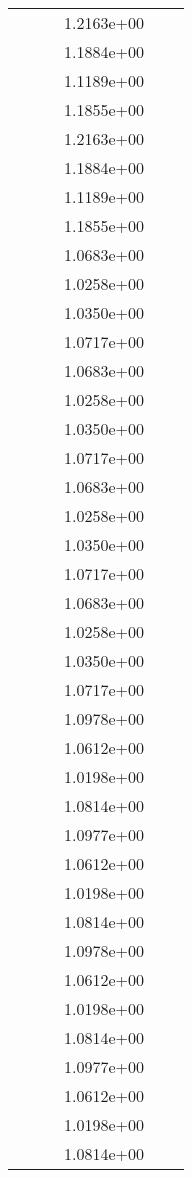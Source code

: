 \begin{xltabular}{\textwidth}{r|rS[table-format=1.3e+2]S[table-format=1.4e+2]S[table-format=1.4e+2]S[table-format=-1.5]}
&  &  & 1.2163e+00 & & \\
&  &  & 1.1884e+00 & & \\
&  &  & 1.1189e+00 & & \\
&  &  & 1.1855e+00 & & \\
&  &  & 1.2163e+00 & & \\
&  &  & 1.1884e+00 & & \\
&  &  & 1.1189e+00 & & \\
&  &  & 1.1855e+00 & & \\
&  &  & 1.0683e+00 & & \\
&  &  & 1.0258e+00 & & \\
&  &  & 1.0350e+00 & & \\
&  &  & 1.0717e+00 & & \\
&  &  & 1.0683e+00 & & \\
&  &  & 1.0258e+00 & & \\
&  &  & 1.0350e+00 & & \\
&  &  & 1.0717e+00 & & \\
&  &  & 1.0683e+00 & & \\
&  &  & 1.0258e+00 & & \\
&  &  & 1.0350e+00 & & \\
&  &  & 1.0717e+00 & & \\
&  &  & 1.0683e+00 & & \\
&  &  & 1.0258e+00 & & \\
&  &  & 1.0350e+00 & & \\
&  &  & 1.0717e+00 & & \\
&  &  & 1.0978e+00 & & \\
&  &  & 1.0612e+00 & & \\
&  &  & 1.0198e+00 & & \\
&  &  & 1.0814e+00 & & \\
&  &  & 1.0977e+00 & & \\
&  &  & 1.0612e+00 & & \\
&  &  & 1.0198e+00 & & \\
&  &  & 1.0814e+00 & & \\
&  &  & 1.0978e+00 & & \\
&  &  & 1.0612e+00 & & \\
&  &  & 1.0198e+00 & & \\
&  &  & 1.0814e+00 & & \\
&  &  & 1.0977e+00 & & \\
&  &  & 1.0612e+00 & & \\
&  &  & 1.0198e+00 & & \\
&  &  & 1.0814e+00 & & \\

\end{xltabular}
